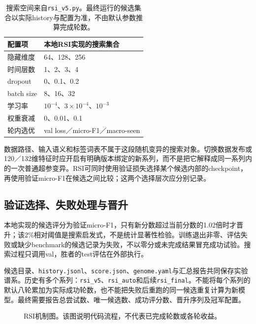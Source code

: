 \documentclass[10pt,twocolumn,letterpaper]{article}
\newcommand{\code}[1]{\texttt{\small #1}}
\begin{document}
\begin{table}[t]
\centering\small
\begin{tabular}{ll}
\toprule 配置项 & 本地RSI实现的搜索集合\\\midrule
隐藏维度 & 64、128、256\\
时间层数 & 1、2、3、4\\
dropout & 0、0.1、0.2\\
batch size & 8、16、32\\
学习率 & $10^{-4}$、$3\times10^{-4}$、$10^{-3}$\\
权重衰减 & 0、0.01、0.1\\
轮内选优 & val loss／micro-F1／macro-seen\\
\bottomrule
\end{tabular}
\caption{搜索空间来自\texttt{rsi\_v5.py}。最终运行的候选集合以实际history与配置为准，不由默认参数推算完成轮数。}
\end{table}

数据路径、输入语义和标签词表不属于这段随机变异的搜索对象。切换数据发布或120／132维特征时应开启有明确版本绑定的新系列，而不是把它解释成同一系列内的一次普通超参变异。RSI可同时使用验证损失选择某个候选内部的checkpoint，再使用验证micro-F1在候选之间比较；这两个选择层次应分别记录。

\subsection{验证选择、失败处理与晋升}
本地实现的候选评分为验证micro-F1，只有新分数超过当前分数的1.02倍时才晋升；该2\%相对阈值是搜索启发式，不是统计显著性检验。训练退出非零、评估失败或缺少benchmark的候选记录为失败，不以零分或未完成结果冒充成功试验。搜索过程只调用val，胜者的test评估在外部执行。

候选目录、\code{history.jsonl}、\code{score.json}、\code{genome.yaml}与汇总报告共同保存实验谱系。历史有多个系列：\code{rsi\_v5}、\code{rsi\_auto}和后续\code{rsi\_final}。不能将每个系列的默认八轮累加为实际成功轮数，也不能把失败后重跑的同一候选重复计算为新模型。最终需要报告总尝试数、唯一候选数、成功评分数、晋升序列及冠军配置。

\begin{figure}[t]
\centering
{}
\caption{RSI机制图。该图说明代码流程，不代表已完成轮数或各轮收益。}
\label{fig:rsi}
\end{figure}
\end{document}
